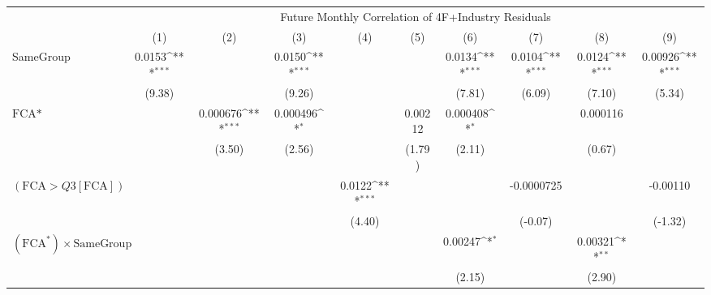 {
\def\sym#1{\ifmmode^{#1}\else\(^{#1}\)\fi}
\begin{tabular}{l*{9}{c}}
\hline\hline
                &\multicolumn{9}{c}{Future Monthly Correlation of 4F+Industry Residuals}                                                                                                   \\\cmidrule(lr){2-10}
                &\multicolumn{1}{c}{(1)}         &\multicolumn{1}{c}{(2)}         &\multicolumn{1}{c}{(3)}         &\multicolumn{1}{c}{(4)}         &\multicolumn{1}{c}{(5)}         &\multicolumn{1}{c}{(6)}         &\multicolumn{1}{c}{(7)}         &\multicolumn{1}{c}{(8)}         &\multicolumn{1}{c}{(9)}         \\
\hline
SameGroup       &   0.0153\sym{***}&                  &   0.0150\sym{***}&                  &                  &   0.0134\sym{***}&   0.0104\sym{***}&   0.0124\sym{***}&  0.00926\sym{***}\\
                &   (9.38)         &                  &   (9.26)         &                  &                  &   (7.81)         &   (6.09)         &   (7.10)         &   (5.34)         \\
[1em]
$ \text{FCA*} $ &                  & 0.000676\sym{***}& 0.000496\sym{*}  &                  &  0.00212         & 0.000408\sym{*}  &                  & 0.000116         &                  \\
                &                  &   (3.50)         &   (2.56)         &                  &   (1.79)         &   (2.11)         &                  &   (0.67)         &                  \\
[1em]
 $ (\text{FCA} > Q3[\text{FCA}]) $ &                  &                  &                  &   0.0122\sym{***}&                  &                  &-0.0000725         &                  & -0.00110         \\
                &                  &                  &                  &   (4.40)         &                  &                  &  (-0.07)         &                  &  (-1.32)         \\
[1em]
 $ (\text{FCA}^*) \times {\text{SameGroup} }  $ &                  &                  &                  &                  &                  &  0.00247\sym{*}  &                  &  0.00321\sym{**} &                  \\
                &                  &                  &                  &                  &                  &   (2.15)         &                  &   (2.90)         &                  \\

\end{tabular}}
